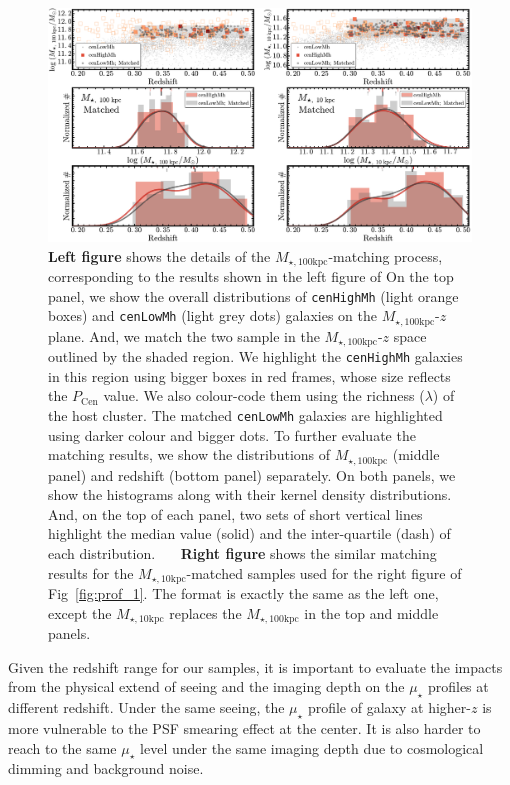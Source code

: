 \documentclass[a4paper,fleqn,usenatbib]{mnras}
\def\rbcg{\texttt{cenHighMh}}
\def\nbcg{\texttt{cenLowMh}}
\def\minn{{$M_{\star,10\mathrm{kpc}}$}}
\def\mtot{{$M_{\star,100\mathrm{kpc}}$}}
\def\mden{{$\mu_{\star}$}}
\begin{document}
\begin{figure}
    \centering 
    \includegraphics[width=15.0cm]{fig/redbcg_match}
    \caption{
        \textbf{Left figure} shows the details of the \mtot{}-matching process, 
        corresponding to the results shown in the left figure of   
        On the top panel, we show the overall distributions of \rbcg{} (light orange boxes) 
        and \nbcg{} (light grey dots) galaxies on the \mtot{}-$z$ plane.  
        And, we match the two sample in the \mtot{}-$z$ space outlined by the shaded region.
        We highlight the \rbcg{} galaxies in this region using bigger boxes in red frames, 
        whose size reflects the $P_{\mathrm{Cen}}$ value.  
        We also colour-code them using the richness ($\lambda$) of the host cluster. 
        The matched \nbcg{} galaxies are highlighted using darker colour and bigger dots. 
        To further evaluate the matching results, we show the distributions of \mtot{} 
        (middle panel) and redshift (bottom panel) separately. 
        On both panels, we show the histograms along with their kernel density 
        distributions.  
        And, on the top of each panel, two sets of short vertical lines highlight the median 
        value (solid) and the inter-quartile (dash) of each distribution.~~~
        \textbf{Right figure} shows the similar matching results for the \minn{}-matched
        samples used for the right figure of Fig~\ref{fig:prof_1}.
        The format is exactly the same as the left one, except the \minn{} replaces the 
        \mtot{} in the top and middle panels.}
    \label{fig:match}
\end{figure}

    Given the redshift range for our samples, it is important to evaluate 
    the impacts from the physical extend of seeing and the imaging depth on the \mden{} 
    profiles at different redshift. 
    Under the same seeing, the \mden{} profile of galaxy at higher-$z$ is more 
    vulnerable to the PSF smearing effect at the center. 
    It is also harder to reach to the same \mden{} level under the same imaging depth 
    due to cosmological dimming and background noise. 
    
\end{document}
